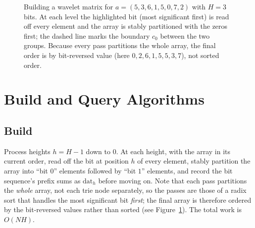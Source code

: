\documentclass[11pt]{article}
\begin{document}
\begin{figure}[H]
\caption{Building a wavelet matrix for $a=(5,3,6,1,5,0,7,2)$ with $H=3$ bits. At each level the highlighted bit (most significant first) is read off every element and the array is stably partitioned with the zeros first; the dashed line marks the boundary $c_0$ between the two groups. Because every pass partitions the whole array, the final order is by bit-reversed value (here $0,2,6,1,5,5,3,7$), not sorted order.}\label{fig:wm_levels}
\end{figure}

\section{Build and Query Algorithms}

\subsection{Build}
Process heights $h = H-1$ down to $0$. At each height, with the array in
its current order, read off the bit at position $h$ of every element,
stably partition the array into ``bit $0$'' elements followed by ``bit
$1$'' elements, and record the bit sequence's prefix sums as
$\mathrm{dat}_h$ before moving on. Note that each pass partitions the
\emph{whole} array, not each trie node separately, so the passes are those
of a radix sort that handles the most significant bit \emph{first}; the
final array is therefore ordered by the bit-reversed values rather than
sorted (see Figure~\ref{fig:wm_levels}). The total work is $O(NH)$.
\end{document}
